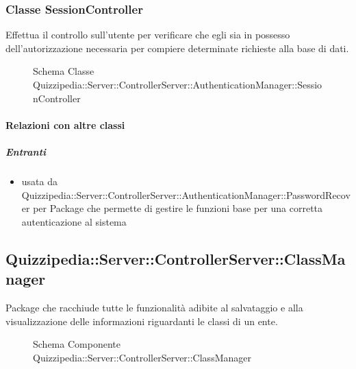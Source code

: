 \subsubsection{Classe SessionController}
Effettua il controllo sull'utente per verificare che egli sia in possesso dell'autorizzazione necessaria per compiere determinate richieste alla base di dati.
\begin{figure}[H]
\centering
\noindent{}
\caption[Schema Classe SessionController]{Schema Classe Quizzipedia::Server::ControllerServer::AuthenticationManager::SessionController}
\end{figure}
\paragraph{Relazioni con altre classi}
\subparagraph{Entranti}
\begin{itemize}
\item usata da Quizzipedia::Server::ControllerServer::AuthenticationManager::PasswordRecover per Package che permette di gestire le funzioni base per una corretta autenticazione al sistema
\end{itemize}
\subsection{Quizzipedia::Server::ControllerServer::ClassManager}
Package che racchiude tutte le funzionalità adibite al salvataggio e alla visualizzazione delle informazioni riguardanti le classi di un ente.
\begin{figure}[H]
\centering
\noindent{}
\caption[Schema Componente Quizzipedia::Server::ControllerServer::ClassManager]{Schema Componente Quizzipedia::Server::ControllerServer::ClassManager}
\end{figure}
